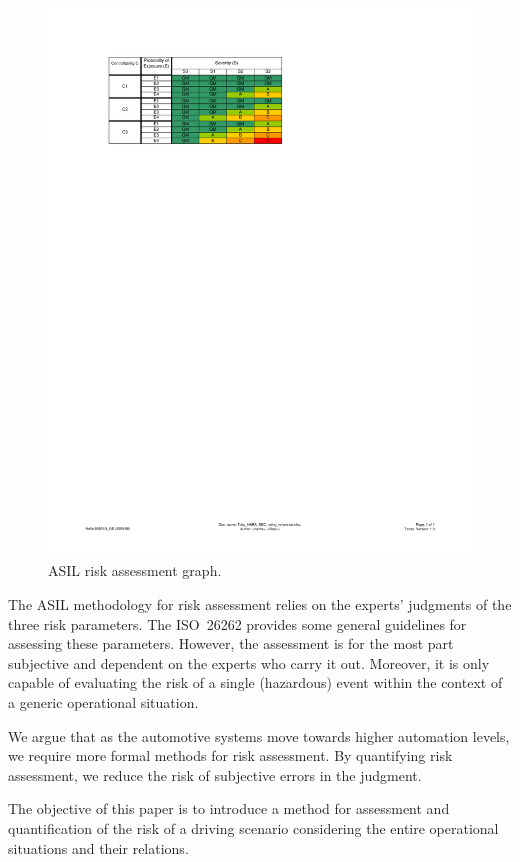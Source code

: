 \documentclass[10pt,final,a4paper,oneside,onecolumn]{article}
\theoremstyle{plain}\newtheorem{definition}{Definition}[section]    %
\theoremstyle{definition}\newtheorem{example}{Example}[section]     %
\theoremstyle{remark}\newtheorem{remarkenv}{Remark}[section]        %
\begin{document}
\begin{figure}[b]
	\centering
	\includegraphics[width=0.6\linewidth]{ASIL}
	\caption{ASIL risk assessment graph.}
	\label{Fig:ASILGraph}
\end{figure}

The ASIL methodology for risk assessment relies on the experts’ judgments of the three risk parameters. The ISO~26262 provides some general guidelines for assessing these parameters. However, the assessment is for the most part subjective and dependent on the experts who carry it out. Moreover, it is only capable of evaluating the risk of a single (hazardous) event within the context of a generic operational situation.


We argue that as the automotive systems move towards higher automation levels, we require more formal methods for risk assessment. By quantifying risk assessment, we reduce the risk of subjective errors in the judgment. 

The objective of this paper is to introduce a method for assessment and quantification of the risk of a driving scenario considering the entire operational situations and their relations. 
\end{document}
